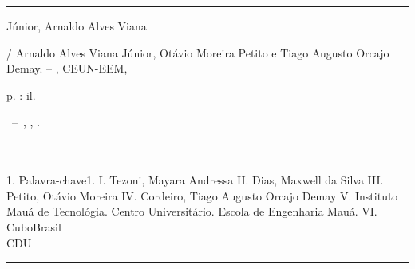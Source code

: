 \documentclass[
	12pt,				%
	openright,			%
	oneside,			%
	a4paper,			%
	english,			%
	french,				%
	spanish,			%
	brazil				%
	]{abntex2}
\begin{document}
\frenchspacing 


\imprimircapa

\imprimirfolhaderosto*


%
%     
\begin{fichacatalografica}
	\vspace*{\fill}					%
	\hrule							%
	\begin{center}					%
	\begin{minipage}[c]{12.5cm}		%
	
	Júnior, Arnaldo Alves Viana
	
	\hspace{0.5cm} \imprimirtitulo  / Arnaldo Alves Viana Júnior, Otávio Moreira Petito e Tiago Augusto Orcajo Demay. --
	\imprimirlocal, CEUN-EEM, \imprimirdata
	
	\hspace{0.5cm} \pageref{LastPage} p. : il. \\
	
	\hspace{0.5cm}
	\parbox[t]{\textwidth}{\imprimirtipotrabalho~--~\imprimirinstituicao,
	\imprimirlocal, \imprimirdata.}\\
	
	\hspace{0.5cm} \imprimirorientadorRotulo~\imprimirorientador\\
	
	\hspace{0.5cm}
		1. Palavra-chave1.
		I. Tezoni, Mayara Andressa
		II. Dias, Maxwell da Silva
		III. Petito, Otávio Moreira
		IV. Cordeiro, Tiago Augusto Orcajo Demay
		V. Instituto Mauá de Tecnológia. Centro Universitário. Escola de Engenharia Mauá.
		VI. CuboBrasil\\ 			
	
	\hspace{8.75cm} CDU \\
	
	\end{minipage}
	\end{center}
	\hrule
\end{fichacatalografica}
\end{document}
